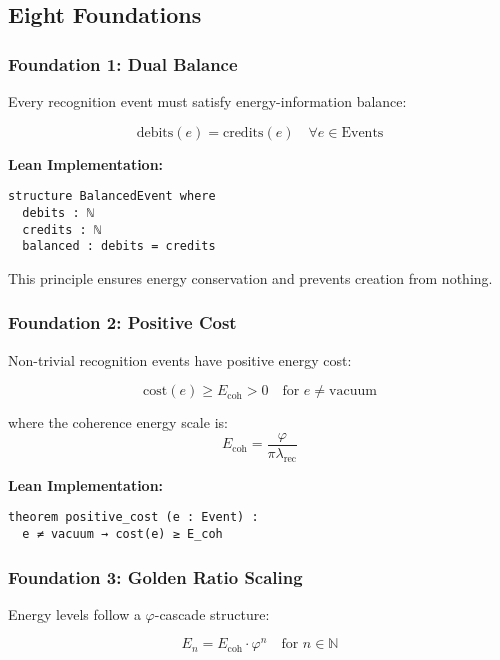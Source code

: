 \documentclass[11pt]{amsart}
\newcommand{\Ecoh}{E_{\text{coh}}}
\newcommand{\lambdarec}{\lambda_{\text{rec}}}
\begin{document}
\subsection{Eight Foundations}

\subsubsection{Foundation 1: Dual Balance}

Every recognition event must satisfy energy-information balance:

\begin{equation}
\text{debits}(e) = \text{credits}(e) \quad \forall e \in \text{Events}
\end{equation}

\textbf{Lean Implementation:}
\begin{lstlisting}
structure BalancedEvent where
  debits : ℕ
  credits : ℕ  
  balanced : debits = credits
\end{lstlisting}

This principle ensures energy conservation and prevents creation from nothing.

\subsubsection{Foundation 2: Positive Cost}

Non-trivial recognition events have positive energy cost:

\begin{equation}
\text{cost}(e) \geq \Ecoh > 0 \quad \text{for } e \neq \text{vacuum}
\end{equation}

where the coherence energy scale is:
\begin{equation}
\Ecoh = \frac{\varphi}{\pi \lambdarec}
\end{equation}

\textbf{Lean Implementation:}
\begin{lstlisting}
theorem positive_cost (e : Event) : 
  e ≠ vacuum → cost(e) ≥ E_coh
\end{lstlisting}

\subsubsection{Foundation 3: Golden Ratio Scaling}

Energy levels follow a $\varphi$-cascade structure:

\begin{equation}
E_n = \Ecoh \cdot \varphi^n \quad \text{for } n \in \mathbb{N}
\end{equation}
\end{document}

